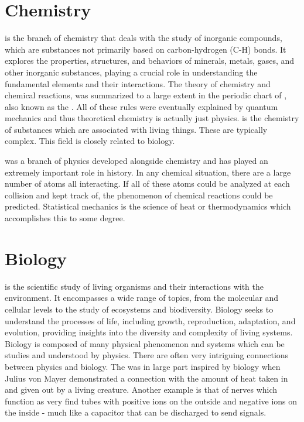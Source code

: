 \section{Chemistry}

 is the branch of chemistry that deals with the study of inorganic compounds, which are substances not primarily based on carbon-hydrogen (C-H) bonds. It explores the properties, structures, and behaviors of minerals, metals, gases, and other inorganic substances, playing a crucial role in understanding the fundamental elements and their interactions. The theory of chemistry and chemical reactions, was summarized to a large extent in the periodic chart of , also known as the . All of these rules were eventually explained by quantum mechanics and thus theoretical chemistry is actually just physics.  is the chemistry of substances which are associated with living things. These are typically complex. This field is closely related to biology.

 was a branch of physics developed alongside chemistry and has played an extremely important role in history. In any chemical situation, there are a large number of atoms all interacting. If all of these atoms could be analyzed at each collision and kept track of, the phenomenon of chemical reactions could be predicted. Statistical mechanics is the science of heat or thermodynamics which accomplishes this to some degree.



\section{Biology}

 is the scientific study of living organisms and their interactions with the environment. It encompasses a wide range of topics, from the molecular and cellular levels to the study of ecosystems and biodiversity. Biology seeks to understand the processes of life, including growth, reproduction, adaptation, and evolution, providing insights into the diversity and complexity of living systems. Biology is composed of many physical phenomenon and systems which can be studies and understood by physics. There are often very intriguing connections between physics and biology. The  was in large part inspired by biology when Julius von Mayer demonstrated a connection with the amount of heat taken in and given out by a living creature. Another example is that of nerves which function as very find tubes with positive ions on the outside and negative ions on the inside - much like a capacitor that can be discharged to send signals.

